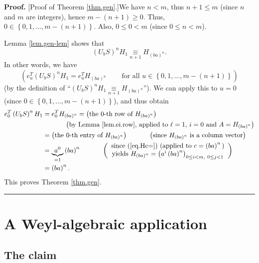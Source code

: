 \documentclass[numbers=enddot,12pt,final,onecolumn,notitlepage]{scrartcl}%
\theoremstyle{definition}
\newenvironment{proof}[1][Proof]{\noindent\textbf{#1.} }{\ \rule{0.5em}{0.5em}}
\begin{document}
\begin{proof}
[Proof of Theorem \ref{thm.gen}.]We have $n<m$, thus $n+1\leq m$ (since $n$
and $m$ are integers), hence $m-\left(  n+1\right)  \geq0$. Thus,
$0\in\left\{  0,1,\ldots,m-\left(  n+1\right)  \right\}  $. Also, $0\leq0<m$
(since $0\leq n<m$).

Lemma \ref{lem.gen-lem} shows that
\[
\left(  U_{b}S\right)  ^{n}H_{1}\underset{n+1}{\equiv}H_{\left(  ba\right)
^{n}}.
\]
In other words, we have
\[
\left(  e_{u}^{T}\left(  U_{b}S\right)  ^{n}H_{1}=e_{u}^{T}H_{\left(
ba\right)  ^{n}}\ \ \ \ \ \ \ \ \ \ \text{for all }u\in\left\{  0,1,\ldots
,m-\left(  n+1\right)  \right\}  \right)
\]
(by the definition of \textquotedblleft$\left(  U_{b}S\right)  ^{n}%
H_{1}\underset{n+1}{\equiv}H_{\left(  ba\right)  ^{n}}$\textquotedblright). We
can apply this to $u=0$ (since $0\in\left\{  0,1,\ldots,m-\left(  n+1\right)
\right\}  $), and thus obtain%
\begin{align*}
e_{0}^{T}\left(  U_{b}S\right)  ^{n}H_{1}  &  =e_{0}^{T}H_{\left(  ba\right)
^{n}}=\left(  \text{the }0\text{-th row of }H_{\left(  ba\right)  ^{n}}\right)
\\
&  \ \ \ \ \ \ \ \ \ \ \left(  \text{by Lemma \ref{lem.ei.row}, applied to
}\ell=1\text{, }i=0\text{ and }A=H_{\left(  ba\right)  ^{n}}\right) \\
&  =\left(  \text{the }0\text{-th entry of }H_{\left(  ba\right)  ^{n}%
}\right)  \ \ \ \ \ \ \ \ \ \ \left(  \text{since }H_{\left(  ba\right)  ^{n}%
}\text{ is a column vector}\right) \\
&  =\underbrace{a^{0}}_{=1}\left(  ba\right)  ^{n}\ \ \ \ \ \ \ \ \ \ \left(
\begin{array}
[c]{c}%
\text{since (\ref{eq.Hc=}) (applied to }c=\left(  ba\right)  ^{n}\text{)}\\
\text{yields }H_{\left(  ba\right)  ^{n}}=\left(  a^{i}\left(  ba\right)
^{n}\right)  _{0\leq i<m,\ 0\leq j<1}%
\end{array}
\right) \\
&  =\left(  ba\right)  ^{n}.
\end{align*}
This proves Theorem \ref{thm.gen}.
\end{proof}

\section{\label{sect.weyl}A Weyl-algebraic application}

\subsection{The claim}
\end{document}
